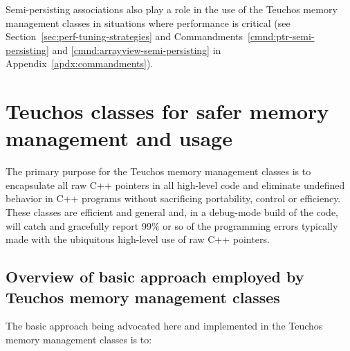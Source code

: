 \documentclass[pdf,ps2pdf,11pt]{SANDreport}
\begin{document}
Semi-persisting associations also play a role in the use of the
Teuchos memory management classes in situations where performance is
critical (see Section~\ref{sec:perf-tuning-strategies} and
Commandments~\ref{cmnd:ptr-semi-persisting} and
{}\ref{cmnd:arrayview-semi-persisting} in
Appendix~\ref{apdx:commandments}).


%
{}\section{Teuchos classes for safer memory management and usage}
\label{sec:teuchos-mem-mng-classes}
%

The primary purpose for the Teuchos memory management classes is to
encapsulate all raw C++ pointers in all high-level code and eliminate
undefined behavior in C++ programs without sacrificing portability,
control or efficiency.  These classes are efficient and general and,
in a debug-mode build of the code, will catch and gracefully report
99\% or so of the programming errors typically made with the
ubiquitous high-level use of raw C++ pointers.


%
{}\subsection{Overview of basic approach employed by Teuchos
memory management classes}
\label{sec:overview_of_basic_approach}
%

The basic approach being advocated here and implemented in the Teuchos
memory management classes is to:
\end{document}
